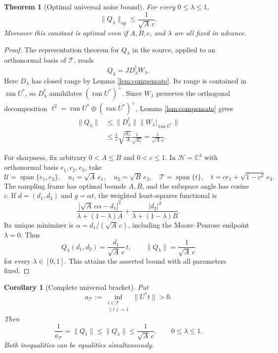 \documentclass[11pt]{article}
\newtheorem{theorem}{Theorem}
\newtheorem{corollary}{Corollary}
\newcommand{\Hh}{\mathcal H}
\newcommand{\Tt}{\mathcal T}
\newcommand{\Uu}{\mathcal U}
\DeclareMathOperator{\ran}{ran}
\begin{document}
\begin{theorem}[Optimal universal noise bound]\label{thm:main}
For every $0\le\lambda\le1$,
\[
                 \boxed{\displaystyle
                 \|Q_\lambda\|_{\mathrm{op}}
                 \le\frac1{\sqrt A\,c}.}
\]
Moreover this constant is optimal even if $A,B,c$, and $\lambda$ are all
fixed in advance.
\end{theorem}

\begin{proof}
The representation theorem for $Q_\lambda$ in the source, applied to an
orthonormal basis of $\Tt$, reads
\[
                    Q_\lambda=J D_\lambda^\dagger W_\lambda.
\]
Here $D_\lambda$ has closed range by Lemma \ref{lem:compensate}.  Its range
is contained in $\ran U^*$, so $D_\lambda^\dagger$ annihilates
$(\ran U^*)^\perp$.  Since $W_\lambda$ preserves the orthogonal decomposition
$\ell^2=\ran U^*\oplus(\ran U^*)^\perp$, Lemma \ref{lem:compensate} gives
\begin{align*}
 \|Q_\lambda\|
 &\le \|D_\lambda^\dagger\|
       \|W_\lambda|_{\ran U^*}\|\\
 &\le \frac1c\sqrt{\frac{d_\lambda}{A}}
       \frac1{\sqrt{d_\lambda}}
  =\frac1{\sqrt A\,c}.
\end{align*}

For sharpness, fix arbitrary $0<A\le B$ and $0<c\le1$.  In
$\Hh=\mathbb C^3$ with orthonormal basis $e_1,e_2,e_3$, take
\[
 \Uu=\operatorname{span}\{e_1,e_2\},\quad
 u_1=\sqrt A\,e_1,\quad u_2=\sqrt B\,e_2,
 \quad
 \Tt=\operatorname{span}\{t\},
 \quad t=ce_1+\sqrt{1-c^2}\,e_3.
\]
The sampling frame has optimal bounds $A,B$, and the subspace angle has
cosine $c$.  If $d=(d_1,d_2)$ and $g=\alpha t$, the weighted least-squares
functional is
\[
 \frac{|\sqrt A\,c\alpha-d_1|^2}{\lambda+(1-\lambda)A}
 +\frac{|d_2|^2}{\lambda+(1-\lambda)B}.
\]
Its unique minimizer is
$\alpha=d_1/(\sqrt A\,c)$, including the Moore--Penrose endpoint
$\lambda=0$.  Thus
\[
 Q_\lambda(d_1,d_2)=\frac{d_1}{\sqrt A\,c}\,t,
 \qquad \|Q_\lambda\|=\frac1{\sqrt A\,c}
\]
for every $\lambda\in[0,1]$.  This attains the asserted bound with all
parameters fixed.
\end{proof}

\begin{corollary}[Complete universal bracket]
Put
\[
 a_{\Tt}:=\inf_{\substack{t\in\Tt\\\|t\|=1}}\|U^*t\|>0.
\]
Then
\[
 \frac1{a_{\Tt}}=\|Q_1\|\le\|Q_\lambda\|
 \le\frac1{\sqrt A\,c},\qquad 0\le\lambda\le1.
\]
Both inequalities can be equalities simultaneously.
\end{corollary}
\end{document}
